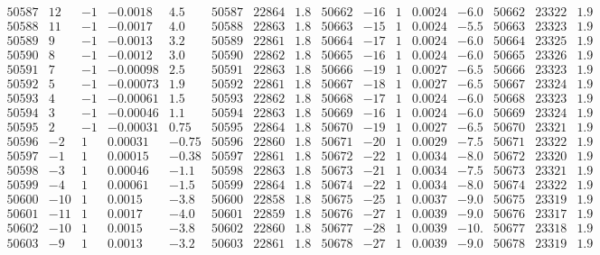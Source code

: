 \documentclass[11pt,reqno,a4letter]{article}
\numberwithin{figure}{section}
\numberwithin{table}{section}
\theoremstyle{plain}
\numberwithin{theorem}{section}
\theoremstyle{definition}
\begin{document}
\begin{table}[ht]
\begin{equation*}
{\begin{array}{ccccc|ccc||ccccc|ccc}
50587 & 12 & -1 & -0.0018 & 4.5 & 50587 & 22864 & 1.8 & 50662 & -16 & 1 & 0.0024 & -6.0 & 50662 & 23322 & 1.9  \\
50588 & 11 & -1 & -0.0017 & 4.0 & 50588 & 22863 & 1.8 & 50663 & -15 & 1 & 0.0024 & -5.5 & 50663 & 23323 & 1.9  \\
50589 & 9 & -1 & -0.0013 & 3.2 & 50589 & 22861 & 1.8 & 50664 & -17 & 1 & 0.0024 & -6.0 & 50664 & 23325 & 1.9  \\
50590 & 8 & -1 & -0.0012 & 3.0 & 50590 & 22862 & 1.8 & 50665 & -16 & 1 & 0.0024 & -6.0 & 50665 & 23326 & 1.9  \\
50591 & 7 & -1 & -0.00098 & 2.5 & 50591 & 22863 & 1.8 & 50666 & -19 & 1 & 0.0027 & -6.5 & 50666 & 23323 & 1.9  \\
50592 & 5 & -1 & -0.00073 & 1.9 & 50592 & 22861 & 1.8 & 50667 & -18 & 1 & 0.0027 & -6.5 & 50667 & 23324 & 1.9  \\
50593 & 4 & -1 & -0.00061 & 1.5 & 50593 & 22862 & 1.8 & 50668 & -17 & 1 & 0.0024 & -6.0 & 50668 & 23323 & 1.9  \\
50594 & 3 & -1 & -0.00046 & 1.1 & 50594 & 22863 & 1.8 & 50669 & -16 & 1 & 0.0024 & -6.0 & 50669 & 23324 & 1.9  \\
50595 & 2 & -1 & -0.00031 & 0.75 & 50595 & 22864 & 1.8 & 50670 & -19 & 1 & 0.0027 & -6.5 & 50670 & 23321 & 1.9  \\
50596 & -2 & 1 & 0.00031 & -0.75 & 50596 & 22860 & 1.8 & 50671 & -20 & 1 & 0.0029 & -7.5 & 50671 & 23322 & 1.9  \\
50597 & -1 & 1 & 0.00015 & -0.38 & 50597 & 22861 & 1.8 & 50672 & -22 & 1 & 0.0034 & -8.0 & 50672 & 23320 & 1.9  \\
50598 & -3 & 1 & 0.00046 & -1.1 & 50598 & 22863 & 1.8 & 50673 & -21 & 1 & 0.0034 & -7.5 & 50673 & 23321 & 1.9  \\
50599 & -4 & 1 & 0.00061 & -1.5 & 50599 & 22864 & 1.8 & 50674 & -22 & 1 & 0.0034 & -8.0 & 50674 & 23322 & 1.9  \\
50600 & -10 & 1 & 0.0015 & -3.8 & 50600 & 22858 & 1.8 & 50675 & -25 & 1 & 0.0037 & -9.0 & 50675 & 23319 & 1.9  \\
50601 & -11 & 1 & 0.0017 & -4.0 & 50601 & 22859 & 1.8 & 50676 & -27 & 1 & 0.0039 & -9.0 & 50676 & 23317 & 1.9  \\
50602 & -10 & 1 & 0.0015 & -3.8 & 50602 & 22860 & 1.8 & 50677 & -28 & 1 & 0.0039 & -10. & 50677 & 23318 & 1.9  \\
50603 & -9 & 1 & 0.0013 & -3.2 & 50603 & 22861 & 1.8 & 50678 & -27 & 1 & 0.0039 & -9.0 & 50678 & 23319 & 1.9  \\

\end{array}}
\end{equation*}
\end{table}
\end{document}
